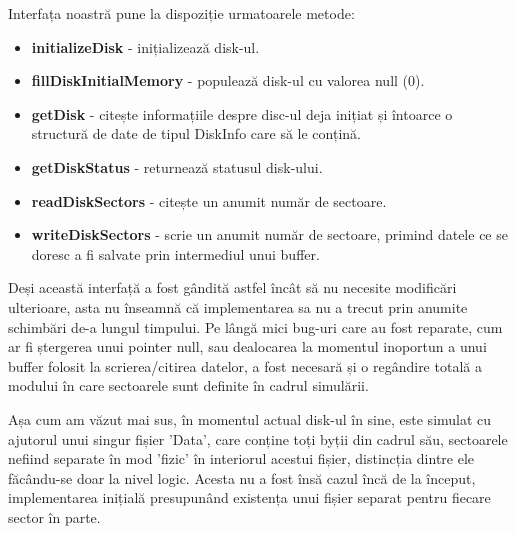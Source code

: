 Interfața noastră pune la dispoziție urmatoarele metode:

\begin{itemize}
  \item \textbf{initializeDisk} - inițializează disk-ul.

  \item \textbf{fillDiskInitialMemory} - populează disk-ul cu valorea null (0).

  \item \textbf{getDisk} - citește informațiile despre disc-ul deja inițiat și întoarce o structură de date de tipul DiskInfo care să le conțină.

  \item \textbf{getDiskStatus} - returnează statusul disk-ului.

  \item \textbf{readDiskSectors} - citește un anumit număr de sectoare.

  \item \textbf{writeDiskSectors} - scrie un anumit număr de sectoare, primind datele ce se doresc a fi salvate prin intermediul unui buffer.
\end{itemize}


Deși această interfață a fost gândită astfel încât să nu necesite modificări ulterioare, asta nu înseamnă că implementarea sa nu a trecut prin anumite schimbări de-a lungul timpului. Pe lângă mici bug-uri care au fost reparate, cum ar fi ștergerea unui pointer null, sau dealocarea la momentul inoportun a unui buffer folosit la scrierea/citirea datelor, a fost necesară și o regândire totală a modului în care sectoarele sunt definite în cadrul simulării.

Așa cum am văzut mai sus, în momentul actual disk-ul în sine, este simulat cu ajutorul unui singur fișier 'Data', care conține toți byții din cadrul său, sectoarele nefiind separate în mod 'fizic' în interiorul acestui fișier, distincția dintre ele făcându-se doar la nivel logic. Acesta nu a fost însă cazul încă de la început, implementarea inițială presupunând existența unui fișier separat pentru fiecare sector în parte.

\bigskip

